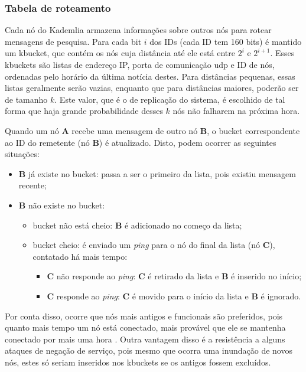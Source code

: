 
\subsubsection*{Tabela de roteamento}

Cada nó do Kademlia armazena informações sobre outros nós para rotear mensagens de
pesquisa. Para cada bit $i$ dos IDs (cada ID tem 160 bits) é mantido um \gls{kbucket},
que contém os nós cuja distância até ele está entre $2^i$ e $2^{i+1}$. Esses
\glspl*{kbucket} são listas de endereço IP, porta de comunicação \gls*{udp} e ID de
nós, ordenadas pelo horário da última notícia destes. Para distâncias pequenas, essas
listas geralmente serão vazias, enquanto que para distâncias maiores, poderão ser de
tamanho $k$. Este valor, que é o de replicação do sistema, é escolhido de tal forma que
haja grande probabilidade desses $k$ nós não falharem na próxima hora.

Quando um nó \textbf{A} recebe uma mensagem de outro nó \textbf{B}, o \gls*{bucket}
correspondente ao ID do remetente (nó \textbf{B}) é atualizado. Disto, podem ocorrer as
seguintes situações:

\begin{itemize}
    \item \textbf{B} já existe no \gls*{bucket}: passa a ser o primeiro da lista, pois
        existiu mensagem recente;

    \item \textbf{B} não existe no \gls*{bucket}:
        \begin{itemize}
            \item \gls*{bucket} não está cheio: \textbf{B} é adicionado no começo da
                lista;
            \item \gls*{bucket} cheio: é enviado um \emph{ping} para o nó do final da
                lista (nó \textbf{C}), contatado há mais tempo:

                \begin{itemize}
                    \item \textbf{C} não responde ao \emph{ping}: \textbf{C} é retirado
                        da lista e \textbf{B} é inserido no início;
                    \item \textbf{C} responde ao \emph{ping}: \textbf{C} é movido para o
                        início da lista e \textbf{B} é ignorado.
                \end{itemize}
        \end{itemize}
\end{itemize}

Por conta disso, ocorre que nós mais antigos e funcionais são preferidos, pois quanto
mais tempo um nó está conectado, mais provável que ele se mantenha conectado por mais
uma hora \cite{artigo:gnutella-uptime}. Outra vantagem disso é a resistência a alguns
ataques de negação de serviço, pois mesmo que ocorra uma inundação de novos nós, estes
só seriam inseridos nos \glspl*{kbucket} se os antigos fossem excluídos.